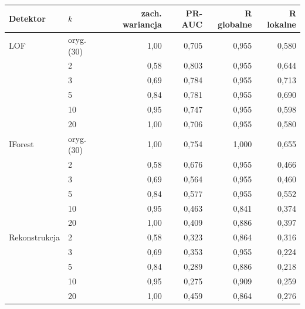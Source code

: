 \begin{tabular}{llrrrr}
\toprule
Detektor & $k$ & zach. wariancja & PR-AUC & R globalne & R lokalne \\
\midrule
LOF & oryg. (30) & 1,00 & 0,705 & 0,955 & 0,580 \\
 & 2 & 0,58 & 0,803 & 0,955 & 0,644 \\
 & 3 & 0,69 & 0,784 & 0,955 & 0,713 \\
 & 5 & 0,84 & 0,781 & 0,955 & 0,690 \\
 & 10 & 0,95 & 0,747 & 0,955 & 0,598 \\
 & 20 & 1,00 & 0,706 & 0,955 & 0,580 \\
IForest & oryg. (30) & 1,00 & 0,754 & 1,000 & 0,655 \\
 & 2 & 0,58 & 0,676 & 0,955 & 0,466 \\
 & 3 & 0,69 & 0,564 & 0,955 & 0,460 \\
 & 5 & 0,84 & 0,577 & 0,955 & 0,552 \\
 & 10 & 0,95 & 0,463 & 0,841 & 0,374 \\
 & 20 & 1,00 & 0,409 & 0,886 & 0,397 \\
Rekonstrukcja & 2 & 0,58 & 0,323 & 0,864 & 0,316 \\
 & 3 & 0,69 & 0,353 & 0,955 & 0,224 \\
 & 5 & 0,84 & 0,289 & 0,886 & 0,218 \\
 & 10 & 0,95 & 0,275 & 0,909 & 0,259 \\
 & 20 & 1,00 & 0,459 & 0,864 & 0,276 \\
\bottomrule
\end{tabular}

